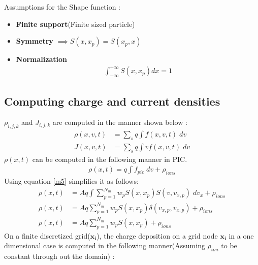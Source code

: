 \documentclass{article}
\begin{document}
Assumptions for the Shape function :
\begin{itemize}
    \item \textbf{Finite support}(Finite sized particle)
    \item \textbf{Symmetry} $\implies S(x,x_{p}) = S(x_{p},x)$
    \item \textbf{Normalization}
    \begin{align}
    \int_{-\infty}^{+\infty} S(x,x_{p})dx = 1 \label{norm_shape}
    \end{align}
\end{itemize}


\subsection*{Computing charge and current densities}

$\rho_{i,j,k}$ and $J_{i,j,k}$ are computed in the manner shown below : 
\begin{align}
\rho (x, v, t) &= \sum_{s} q\int f(x, v, t)\;dv  \label{m5}\\
J(x, v, t) &= \sum_{s} q\int vf(x, v, t)\;dv \label{m6}
\end{align} 
$\rho(x, t)$ can be computed in the following manner in PIC.
\begin{align}
\rho (x, t) = q \int f_{pic}\;dv  + \rho_{ions}
\end{align}
Using equation \ref{m5} simplifies it as follows:
\begin{align}
\rho (x, t) &= Aq \int \sum_{p=1}^{N_{m}} w_{p}S(x, x_{p})S(v, v_{x,p})\;dv_{x} + \rho_{ions}\\
\rho (x, t) &=  Aq \sum_{p=1}^{N_{m}} w_{p}S(x, x_{p})\delta(v_{x,p}, v_{x,p}) + \rho_{ions}\\
\rho (x, t) &=  Aq \sum_{p=1}^{N_{m}} w_{p}S(x, x_{p}) + \rho_{ions}
\end{align}
On a finite discretized grid($\mathbf{x_{i}}$), the charge deposition on a grid node $\mathbf{x_{i}}$ in a one dimensional case is computed in the following manner(Assuming $\rho_{ion}$ to be constant through out the domain) :
\end{document}
